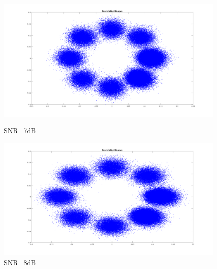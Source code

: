 \begin{spacing}{1.5}
\begin{figure}[H]
\begin{minipage}[t]{0.5\linewidth}
\centering
\includegraphics[width=0.9\columnwidth]{constellation13.png}
\caption{SNR=7dB}
\end{minipage}
\hfill
\begin{minipage}[t]{0.5\linewidth}
\centering
\includegraphics[width=0.9\columnwidth]{constellation14.png}
\caption{SNR=8dB}
\end{minipage}
\end{figure}




\end{spacing}
